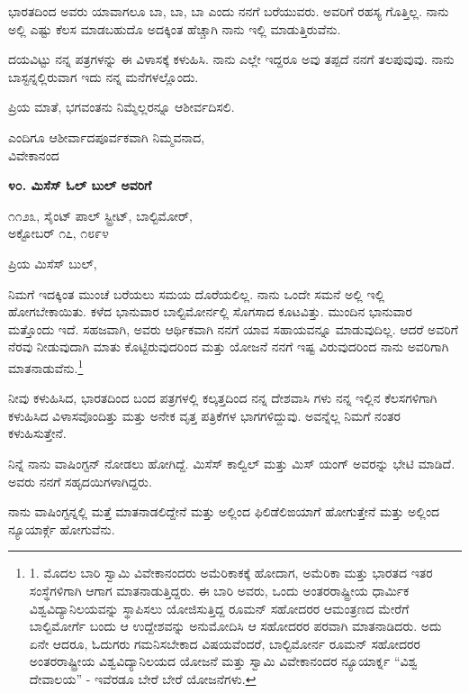 ಭಾರತದಿಂದ ಅವರು ಯಾವಾಗಲೂ ಬಾ, ಬಾ, ಬಾ ಎಂದು ನನಗೆ ಬರೆಯುವರು. ಅವರಿಗೆ ರಹಸ್ಯ ಗೊತ್ತಿಲ್ಲ. ನಾನು ಅಲ್ಲಿ ಎಷ್ಟು ಕೆಲಸ ಮಾಡಬಹುದೊ ಅದಕ್ಕಿಂತ ಹೆಚ್ಚಾಗಿ ನಾನು ಇಲ್ಲಿ ಮಾಡುತ್ತಿರುವೆನು.

ದಯವಿಟ್ಟು ನನ್ನ ಪತ್ರಗಳನ್ನು ಈ ವಿಳಾಸಕ್ಕೆ ಕಳುಹಿಸಿ. ನಾನು ಎಲ್ಲೇ ಇದ್ದರೂ ಅವು ತಪ್ಪದೆ ನನಗೆ ತಲಪುವುವು. ನಾನು ಬಾಸ್ಟನ್ನಲ್ಲಿರುವಾಗ ಇದು ನನ್ನ ಮನೆಗಳಲ್ಲೊಂದು.

ಪ್ರಿಯ ಮಾತೆ, ಭಗವಂತನು ನಿಮ್ಮೆಲ್ಲರನ್ನೂ ಆಶೀರ್ವದಿಸಲಿ.

\begin{flushright}
ಎಂದಿಗೂ ಆಶೀರ್ವಾದಪೂರ್ವಕವಾಗಿ ನಿಮ್ಮವನಾದ,\\ವಿವೇಕಾನಂದ
\end{flushright}

\begin{center}
\textbf{೪೦. ಮಿಸೆಸ್ ಓಲ್ ಬುಲ್ ಅವರಿಗೆ}
\end{center}

\begin{flushright}
೧೧೨೩, ಸೈಂಟ್ ಪಾಲ್ ಸ್ಟ್ರೀಟ್, ಬಾಲ್ಟಿಮೋರ್,\\ಅಕ್ಟೋಬರ್ ೧೭, ೧೮೯೪
\end{flushright}

ಪ್ರಿಯ ಮಿಸೆಸ್ ಬುಲ್,

ನಿಮಗೆ ಇದಕ್ಕಿಂತ ಮುಂಚೆ ಬರೆಯಲು ಸಮಯ ದೊರೆಯಲಿಲ್ಲ. ನಾನು ಒಂದೇ ಸಮನೆ ಅಲ್ಲಿ ಇಲ್ಲಿ ಹೋಗಬೇಕಾಯಿತು. ಕಳೆದ ಭಾನುವಾರ ಬಾಲ್ಟಿಮೋರ್ನಲ್ಲಿ ಸೊಗಸಾದ ಕೂಟವಿತ್ತು. ಮುಂದಿನ ಭಾನುವಾರ ಮತ್ತೊಂದು ಇದೆ. ಸಹಜವಾಗಿ, ಅವರು ಆರ್ಥಿಕವಾಗಿ ನನಗೆ ಯಾವ ಸಹಾಯವನ್ನೂ ಮಾಡುವುದಿಲ್ಲ. ಆದರೆ ಅವರಿಗೆ ನೆರವು ನೀಡುವುದಾಗಿ ಮಾತು ಕೊಟ್ಟಿರುವುದರಿಂದ ಮತ್ತು ಯೋಜನೆ ನನಗೆ ಇಷ್ಟ ವಿರುವುದರಿಂದ ನಾನು ಅವರಿಗಾಗಿ ಮಾತನಾಡುವೆನು.\footnote{1. ಮೊದಲ ಬಾರಿ ಸ್ವಾಮಿ ವಿವೇಕಾನಂದರು ಅಮೆರಿಕಾಕಕ್ಕೆ ಹೋದಾಗ, ಅಮೆರಿಕಾ ಮತ್ತು ಭಾರತದ ಇತರ ಸಂಸ್ಥೆಗಳಿಗಾಗಿ ಆಗಾಗ ಮಾತನಾಡುತ್ತಿದ್ದರು. ಈ ಬಾರಿ ಅವರು, ಒಂದು ಅಂತರರಾಷ್ಟ್ರೀಯ ಧಾರ್ಮಿಕ ವಿಶ್ವವಿದ್ಯಾನಿಲಯವನ್ನು ಸ್ಥಾಪಿಸಲು ಯೋಜಿಸುತ್ತಿದ್ದ ರೂಮನ್ ಸಹೋದರರ ಆಮಂತ್ರಣದ ಮೇರೆಗೆ ಬಾಲ್ಟಿಮೋರ್ಗೆ ಬಂದು ಆ ಉದ್ದೇಶವನ್ನು ಅನುಮೋದಿಸಿ ಆ ಸಹೋದರರ ಪರವಾಗಿ ಮಾತನಾಡಿದರು. ಅದು ಏನೇ ಆದರೂ, ಓದುಗರು ಗಮನಿಸಬೇಕಾದ ವಿಷಯವೆಂದರೆ, ಬಾಲ್ಟಿಮೋರ್ನ ರೂಮನ್ ಸಹೋದರರ ಅಂತರರಾಷ್ಟ್ರೀಯ ವಿಶ್ವವಿದ್ಯಾನಿಲಯದ ಯೋಜನೆ ಮತ್ತು ಸ್ವಾಮಿ ವಿವೇಕಾನಂದರ ನ್ಯೂಯಾರ್ಕ್ನ “ವಿಶ್ವ ದೇವಾಲಯ” - ಇವೆರಡೂ ಬೇರೆ ಬೇರೆ ಯೋಜನೆಗಳು.}

ನೀವು ಕಳುಹಿಸಿದ, ಭಾರತದಿಂದ ಬಂದ ಪತ್ರಗಳಲ್ಲಿ ಕಲ್ಕತ್ತದಿಂದ ನನ್ನ ದೇಶವಾಸಿ ಗಳು ನನ್ನ ಇಲ್ಲಿನ ಕೆಲಸಗಳಿಗಾಗಿ ಕಳುಹಿಸಿದ ವಿಳಾಸವೊಂದಿತ್ತು ಮತ್ತು ಅನೇಕ ವೃತ್ತ ಪತ್ರಿಕೆಗಳ ಭಾಗಗಳಿದ್ದುವು. ಅವನ್ನೆಲ್ಲ ನಿಮಗೆ ನಂತರ ಕಳುಹಿಸುತ್ತೇನೆ.

ನಿನ್ನೆ ನಾನು ವಾಷಿಂಗ್ಟನ್ ನೋಡಲು ಹೋಗಿದ್ದೆ. ಮಿಸೆಸ್ ಕಾಲ್ವಿಲ್ ಮತ್ತು ಮಿಸ್ ಯಂಗ್ ಅವರನ್ನು ಭೇಟಿ ಮಾಡಿದೆ. ಅವರು ನನಗೆ ಸಹೃದಯಿಗಳಾಗಿದ್ದರು.

ನಾನು ವಾಷಿಂಗ್ಟನ್ನಲ್ಲಿ ಮತ್ತೆ ಮಾತನಾಡಲಿದ್ದೇನೆ ಮತ್ತು ಅಲ್ಲಿಂದ ಫಿಲಿಡೆಲಿಙಯಾಗೆ ಹೋಗುತ್ತೇನೆ ಮತ್ತು ಅಲ್ಲಿಂದ ನ್ಯೂಯಾರ್ಕ್ಗೆ ಹೋಗುವೆನು.

